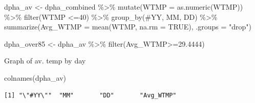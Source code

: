 \documentclass[
  letterpaper,
  DIV=11,
  numbers=noendperiod]{scrreprt}
\newenvironment{Shaded}{\begin{snugshade}}{\end{snugshade}}
\newcommand{\AttributeTok}[1]{\textcolor[rgb]{0.40,0.45,0.13}{#1}}
\newcommand{\ConstantTok}[1]{\textcolor[rgb]{0.56,0.35,0.01}{#1}}
\newcommand{\DecValTok}[1]{\textcolor[rgb]{0.68,0.00,0.00}{#1}}
\newcommand{\FloatTok}[1]{\textcolor[rgb]{0.68,0.00,0.00}{#1}}
\newcommand{\FunctionTok}[1]{\textcolor[rgb]{0.28,0.35,0.67}{#1}}
\newcommand{\NormalTok}[1]{\textcolor[rgb]{0.00,0.23,0.31}{#1}}
\newcommand{\OtherTok}[1]{\textcolor[rgb]{0.00,0.23,0.31}{#1}}
\newcommand{\SpecialCharTok}[1]{\textcolor[rgb]{0.37,0.37,0.37}{#1}}
\newcommand{\StringTok}[1]{\textcolor[rgb]{0.13,0.47,0.30}{#1}}
\begin{document}
\begin{Shaded}
\begin{Highlighting}[]
\NormalTok{dpha\_av }\OtherTok{\textless{}{-}}\NormalTok{ dpha\_combined }\SpecialCharTok{\%\textgreater{}\%}
  \FunctionTok{mutate}\NormalTok{(}\AttributeTok{WTMP =} \FunctionTok{as.numeric}\NormalTok{(WTMP)) }\SpecialCharTok{\%\textgreater{}\%}
  \FunctionTok{filter}\NormalTok{(WTMP }\SpecialCharTok{\textless{}=}\DecValTok{40}\NormalTok{) }\SpecialCharTok{\%\textgreater{}\%}
  \FunctionTok{group\_by}\NormalTok{(}\StringTok{\textquotesingle{}\#YY\textquotesingle{}}\NormalTok{, MM, DD) }\SpecialCharTok{\%\textgreater{}\%}
  \FunctionTok{summarize}\NormalTok{(}\AttributeTok{Avg\_WTMP =} \FunctionTok{mean}\NormalTok{(WTMP, }\AttributeTok{na.rm =} \ConstantTok{TRUE}\NormalTok{), }\AttributeTok{.groups =} \StringTok{"drop"}\NormalTok{)}

\NormalTok{dpha\_over85 }\OtherTok{\textless{}{-}}\NormalTok{ dpha\_av }\SpecialCharTok{\%\textgreater{}\%}
  \FunctionTok{filter}\NormalTok{(Avg\_WTMP}\SpecialCharTok{\textgreater{}=}\FloatTok{29.4444}\NormalTok{)}
\end{Highlighting}
\end{Shaded}

Graph of av. temp by day

\begin{Shaded}
\begin{Highlighting}[]
\FunctionTok{colnames}\NormalTok{(dpha\_av)}
\end{Highlighting}
\end{Shaded}

\begin{verbatim}
[1] "\"#YY\""  "MM"       "DD"       "Avg_WTMP"
\end{verbatim}
\end{document}

